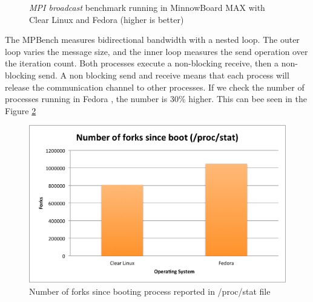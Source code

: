 \begin{figure}[H]
\begin{center}
\end{center}
\caption{\textit{MPI broadcast} benchmark running in  MinnowBoard MAX with Clear Linux and
Fedora (higher is better)}
\label{mpi_broadcast_clr_fedora}
\end{figure}

The MPBench measures bidirectional bandwidth with a nested loop. The outer loop
varies the message size, and the inner loop measures the send operation over
the iteration count. Both processes execute a non-blocking receive, then a
non-blocking send.  A non blocking send and receive means that each process
will release the communication channel to other processes. If we check the
number of processes running in Fedora , the number is 30\% higher. This can bee
seen in the Figure \ref{number_forks_fedora_clr}

\begin{figure}[H]
\centering
\includegraphics[width=1 \textwidth]{images/number_forks.png}
\caption{Number of forks since booting process reported in /proc/stat file }
\label{number_forks_fedora_clr}
\end{figure}

